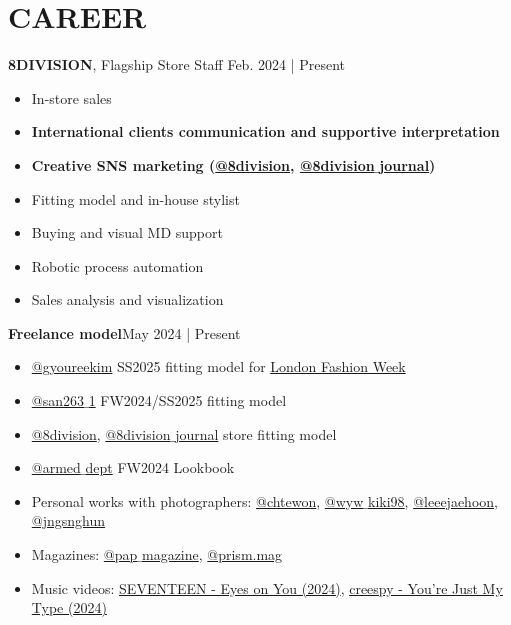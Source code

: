 \documentclass[a4paper,10pt]{extarticle}
\begin{document}
\section*{CAREER}
\noindent
\textbf{8DIVISION}, Flagship Store Staff \hfill Feb. 2024 | Present
\begin{itemize}
	\item In-store sales
	\item \textbf{International clients communication and supportive interpretation}
	\item \textbf{Creative SNS marketing (\href{https://instagram.com/8division}{@8division}, \href{https://instagram.com/8division_journal}{@8division$\_$journal})}
	\item Fitting model and in-house stylist
	\item Buying and visual MD support
	\item Robotic process automation
	\item Sales analysis and visualization
\end{itemize}
\textbf{Freelance model}\hfill May 2024 | Present
\begin{itemize}
	\item \href{https://instagram.com/gyoureekim}{@gyoureekim} SS2025 fitting model for \href{https://instagram.com/londonfashionweek}{London Fashion Week}
	\item \href{https://instagram.com/san263_1}{@san263$\_$1} FW2024/SS2025 fitting model
	\item \href{https://instagram.com/8division}{@8division}, \href{https://instagram.com/8division_journal}{@8division$\_$journal} store fitting model
	\item \href{https://instagram.com/armed_dept}{@armed$\_$dept} FW2024 Lookbook
	\item Personal works with photographers: \href{https://instagram.com/chtewon}{@chtewon}, \href{https://instagram.com/wyw_kiki98}{@wyw$\_$kiki98}, \href{https://instagram.com/leeejaehoon}{@leeejaehoon}, \href{https://instagram.com/jngsnghun}{@jngsnghun}
	\item Magazines: \href{https://instagram.com/pap_magazine}{@pap$\_$magazine}, \href{https://instagram.com/prism.mag}{@prism.mag}
	\item Music videos: \href{https://www.youtube.com/watch?v=JjvX09nG2F0}{SEVENTEEN - Eyes on You (2024)}, \href{https://www.youtube.com/watch?v=9FoALFoanow}{creespy - You're Just My Type (2024)}
\end{itemize}
\end{document}
